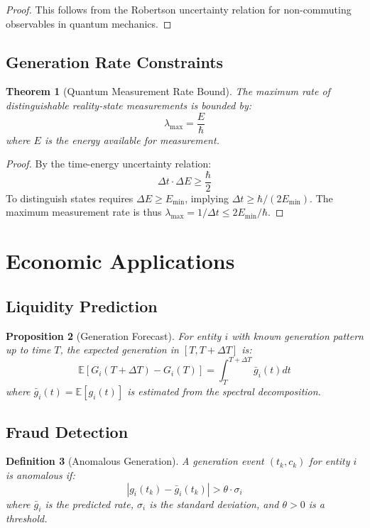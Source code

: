 \documentclass[12pt]{article}
\newtheorem{theorem}{Theorem}
\newtheorem{definition}[theorem]{Definition}
\newtheorem{proposition}[theorem]{Proposition}
\begin{document}
\begin{proof}
This follows from the Robertson uncertainty relation for non-commuting observables in quantum mechanics.
\end{proof}

\subsection{Generation Rate Constraints}

\begin{theorem}[Quantum Measurement Rate Bound]
The maximum rate of distinguishable reality-state measurements is bounded by:
$$
\lambda_{\max} = \frac{E}{\hbar}
$$
where $E$ is the energy available for measurement.
\end{theorem}

\begin{proof}
By the time-energy uncertainty relation:
$$
\Delta t \cdot \Delta E \geq \frac{\hbar}{2}
$$
To distinguish states requires $\Delta E \geq E_{\min}$, implying $\Delta t \geq \hbar/(2E_{\min})$. The maximum measurement rate is thus $\lambda_{\max} = 1/\Delta t \leq 2E_{\min}/\hbar$.
\end{proof}

\section{Economic Applications}

\subsection{Liquidity Prediction}

\begin{proposition}[Generation Forecast]
For entity $i$ with known generation pattern up to time $T$, the expected generation in $[T, T+\Delta T]$ is:
$$
\mathbb{E}[G_i(T+\Delta T) - G_i(T)] = \int_T^{T+\Delta T} \bar{g}_i(t) dt
$$
where $\bar{g}_i(t) = \mathbb{E}[g_i(t)]$ is estimated from the spectral decomposition.
\end{proposition}

\subsection{Fraud Detection}

\begin{definition}[Anomalous Generation]
A generation event $(t_k, c_k)$ for entity $i$ is anomalous if:
$$
|g_i(t_k) - \bar{g}_i(t_k)| > \theta \cdot \sigma_i
$$
where $\bar{g}_i$ is the predicted rate, $\sigma_i$ is the standard deviation, and $\theta > 0$ is a threshold.
\end{definition}
\end{document}

